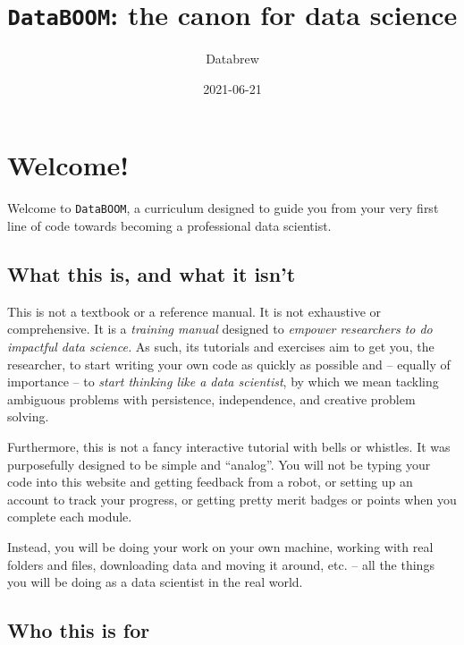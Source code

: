 \documentclass[
]{book}
\title{\texttt{DataBOOM}: the canon for data science}
\author{Databrew}
\date{2021-06-21}
\begin{document}
\maketitle

{
\setcounter{tocdepth}{1}
\tableofcontents
}
\hypertarget{welcome}{%
\chapter{Welcome!}\label{welcome}}

Welcome to \texttt{DataBOOM}, a curriculum designed to guide you from your very first line of code towards becoming a professional data scientist.

\hypertarget{what-this-is-and-what-it-isnt}{%
\section*{What this is, and what it isn't}\label{what-this-is-and-what-it-isnt}}

This is not a textbook or a reference manual. It is not exhaustive or comprehensive. It is a \emph{training manual} designed to \emph{empower researchers to do impactful data science.} As such, its tutorials and exercises aim to get you, the researcher, to start writing your own code as quickly as possible and -- equally of importance -- to \emph{start thinking like a data scientist}, by which we mean tackling ambiguous problems with persistence, independence, and creative problem solving.

Furthermore, this is not a fancy interactive tutorial with bells or whistles. It was purposefully designed to be simple and ``analog''. You will not be typing your code into this website and getting feedback from a robot, or setting up an account to track your progress, or getting pretty merit badges or points when you complete each module.

Instead, you will be doing your work on your own machine, working with real folders and files, downloading data and moving it around, etc. -- all the things you will be doing as a data scientist in the real world.

\hypertarget{who-this-is-for}{%
\section*{Who this is for}\label{who-this-is-for}}
\end{document}

